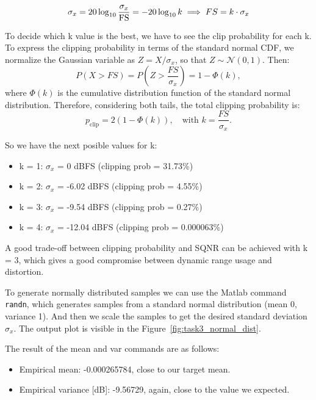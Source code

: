 \documentclass[11pt,a4paper]{article}
\begin{document}
\[
\sigma_x = 20\log_{10}\frac{\sigma_x}{\rm FS} = -20\log_{10}{k} \implies FS = k \cdot \sigma_x
\]

To decide which k value is the best, we have to see the clip probability for each k.
To express the clipping probability in terms of the standard normal CDF, we normalize the Gaussian variable as $Z = X / \sigma_x$, so that $Z \sim \mathcal{N}(0,1)$. Then:
\[
P(X > FS) = P\!\left(Z > \frac{FS}{\sigma_x}\right) = 1 - \Phi\!\left(k\right),
\]
where $\Phi(k)$ is the cumulative distribution function of the standard normal distribution. Therefore, considering both tails, the total clipping probability is:
\[
p_{\text{clip}} = 2(1 - \Phi(k)), \quad \text{with } k = \frac{FS}{\sigma_x}.
\]

So we have the next posible values for k:

\begin{itemize}
    \item k = 1: $\sigma_x$ = 0 dBFS (clipping prob = 31.73\%)
    \item k = 2: $\sigma_x$ = -6.02 dBFS (clipping prob = 4.55\%)
    \item k = 3: $\sigma_x$ = -9.54 dBFS (clipping prob = 0.27\%)
    \item k = 4: $\sigma_x$ = -12.04 dBFS (clipping prob = 0.000063\%)
\end{itemize}

A good trade-off between clipping probability and SQNR can be achieved with k = 3, which gives a good compromise between dynamic range usage and distortion.

To generate normally distributed samples we can use the Matlab command \texttt{randn}, which generates samples from a standard normal distribution (mean 0, variance 1).
And then we scale the samples to get the desired standard deviation $\sigma_x$. The output plot is visible in the Figure~\ref{fig:task3_normal_dist}.

The result of the mean and var commands are as follows:
\begin{itemize}
    \item Empirical mean: -0.000265784, close to our target mean.
    \item Empirical variance [dB]: -9.56729, again, close to the value we expected.
\end{itemize}
    
\end{document}
